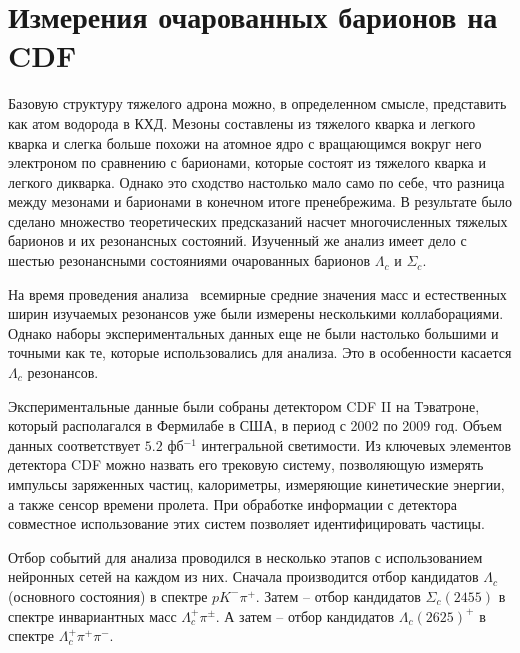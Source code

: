 \documentclass[a4paper, 12pt]{article}
\begin{document}

\clearpage
\section{Измерения очарованных барионов на CDF}


Базовую структуру тяжелого адрона можно, в определенном смысле, 
представить как атом водорода в КХД. Мезоны составлены из тяжелого 
кварка и легкого кварка и слегка больше похожи на атомное ядро 
с вращающимся вокруг него электроном по сравнению с барионами, которые 
состоят из тяжелого кварка и легкого дикварка. Однако это сходство 
настолько мало само по себе, что разница между мезонами и барионами 
в конечном итоге пренебрежима.
%
В результате было сделано множество теоретических предсказаний насчет 
многочисленных тяжелых барионов и их резонансных состояний. Изученный же 
анализ имеет дело с шестью резонансными состояниями очарованных барионов 
$\Lambda_c$ и $\Sigma_c$.


На время проведения анализа~\cite{1-cdf} всемирные средние значения масс 
и естественных ширин изучаемых резонансов уже были измерены несколькими 
коллаборациями. Однако наборы экспериментальных данных еще не были 
настолько большими и точными как те, которые использовались для анализа. 
Это в особенности касается $\Lambda_c$ резонансов.


Экспериментальные данные были собраны детектором CDF II на Тэватроне, 
который располагался в Фермилабе в США, в период с 2002 по 2009 год. 
Объем данных соответствует $5.2$ фб$^{-1}$ интегральной светимости.
%
Из ключевых элементов детектора CDF можно назвать его трековую систему, 
позволяющую измерять импульсы заряженных частиц, калориметры, измеряющие 
кинетические энергии, а также сенсор времени пролета. При обработке 
информации с детектора совместное использование этих систем позволяет 
идентифицировать частицы.

Отбор событий для анализа проводился в несколько этапов с использованием 
нейронных сетей на каждом из них. Сначала производится отбор кандидатов 
$\Lambda_c$ (основного состояния) в спектре $pK^-\pi^+$. Затем -- отбор 
кандидатов $\Sigma_c(2455)$ в спектре инвариантных масс 
$\Lambda_c^+\pi^\pm$. А затем -- отбор кандидатов $\Lambda_c(2625)^+$ 
в спектре $\Lambda_c^+\pi^+\pi^-$.
\end{document}
